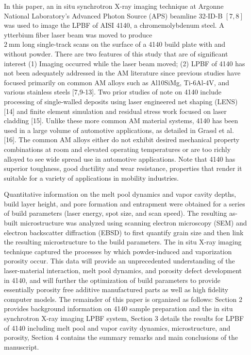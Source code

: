 \documentclass[10pt]{article}
\begin{document}
In this paper, an in situ synchrotron X-ray imaging technique at Argonne National Laboratory's Advanced Photon Source (APS) beamline 32-ID-B $[7,8]$ was used to image the LPBF of AISI 4140, a chromemolybdenum steel. A ytterbium fiber laser beam was moved to produce\\
$2 \mathrm{~mm}$ long single-track scans on the surface of a 4140 build plate with and without powder. There are two features of this study that are of significant interest (1) Imaging occurred while the laser beam moved; (2) LPBF of 4140 has not been adequately addressed in the AM literature since previous studies have focused primarily on common AM alloys such as Al10SiMg, Ti-6Al-4V, and various stainless steels [7,9-13]. Two prior studies of note on 4140 include processing of single-walled deposits using laser engineered net shaping (LENS) [14] and finite element simulation and residual stress work focused on laser cladding [15]. Unlike these more common AM material systems, 4140 has been used in a large volume of automotive applications, as detailed in Grassl et al. [16]. The common AM alloys either do not exhibit desired mechanical property combinations at room and elevated operating temperatures or are too richly alloyed to see wide spread use in automotive applications. Note that 4140 has superior toughness, good ductility and wear resistance, properties that render it suitable for a variety of applications in mobility industries.

Quantitative information on the melt pool dynamics and vapor cavity depths, build layer height, and pore formation and entrapment were obtained for a series of build parameters (laser energy, spot size, and scan speed). The resulting as-built microstructure was analyzed using scanning electron microscopy (SEM) and electron backscatter diffraction (EBSD) to first quantify grain size and then link the resulting microstructure to the build parameters. The in situ X-ray imaging technique captured the processes by which powder-induced and vaporization porosity occur. This data will provide an unprecedented understanding of the laser-material interaction, melt pool dynamics, and porosity defect development in 4140, and will further the optimization of build parameters to provide essentially porosity free additive manufactured parts as well as high fidelity computer models. The remainder of this paper is organized as follows: Section 2 provides background information on 4140 sample preparation and the in situ synchrotron X-ray imaging LPBF system, Section 3 details the results for LPBF of 4140 including melt pool and vapor cavity dynamics, microstructure, and porosity, Section 4 contains the summary remarks and main conclusions of the manuscript.
\end{document}
